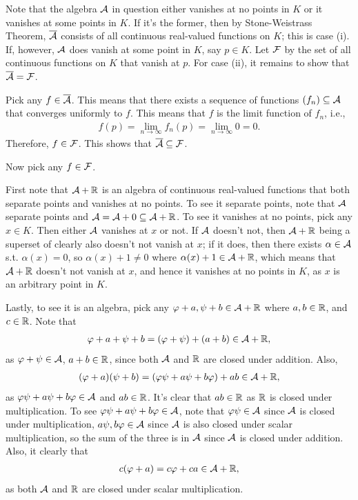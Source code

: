 \documentclass[12pt]{article}
\begin{document}
\begin{fproof}[4]
Note that the algebra \(\mathcal{A}\) in question either vanishes at no points in \(K\) or it vanishes at some points in \(K\). If it's the former, then by Stone-Weistrass Theorem, \(\overline{\mathcal{A}}\) consists of all continuous real-valued functions on \(K\); this is case (i). If, however, \(\mathcal{A}\) does vanish at some point in \(K\), say \(p \in K\). Let \(\mathcal{F}\) by the set of all continuous functions on \(K\) that vanish at \(p\). For case (ii), it remains to show that \(\overline{\mathcal{A}} = \mathcal{F}\).

Pick any \(f \in \overline{\mathcal{A}}\).
This means that there exists a sequence of functions \((f_n) \subseteq \mathcal{A}\) that converges uniformly to \(f\).
This means that \(f\) is the limit function of \(f_n\), i.e.,
\begin{align*}
    f(p) = \lim_{n \to \infty} f_n(p) = \lim_{n \to \infty} 0 = 0.
\end{align*}
Therefore, \(f \in \mathcal{F}\).
This shows that \(\overline{\mathcal{A}} \subseteq \mathcal{F}\).

Now pick any \(f \in \mathcal{F}\).

First note that \(\mathcal{A} + \mathbb {R}\) is an algebra of continuous real-valued functions that both separate points and vanishes at no points.
To see it separate points, note that \(\mathcal{A}\) separate points and \(\mathcal{A} = \mathcal{A} + 0 \subseteq \mathcal{A} + \mathbb {R}\). 
To see it vanishes at no points, pick any \(x \in K\). Then either \(\mathcal{A}\) vanishes at \(x\) or not.
If \(\mathcal{A}\) doesn't not, then \(\mathcal{A} + \mathbb {R}\) being a superset of clearly also doesn't not vanish at \(x\); if it does, then there exists \(\alpha \in \mathcal{A}\) s.t. \(\alpha(x) = 0\), so \(\alpha(x) + 1 \neq 0\) where \(\alpha(x) + 1 \in \mathcal{A} + \mathbb {R}\), which means that \(\mathcal{A} + \mathbb {R}\) doesn't not vanish at \(x\), and hence it vanishes at no points in \(K\), as \(x\) is an arbitrary point in \(K\).

Lastly, to see it is an algebra, pick any \(\varphi + a, \psi + b \in \mathcal{A} + \mathbb {R}\) where \(a,b \in \mathbb {R}\), and \(c \in \mathbb {R}\).
Note that
\begin{align*}
    \varphi + a + \psi + b = (\varphi + \psi) + (a + b) \in \mathcal{A} + \mathbb {R},
\end{align*}
as \(\varphi + \psi \in \mathcal{A}\), \(a+b \in \mathbb {R}\), since both \(\mathcal{A}\) and \(\mathbb {R}\) are closed under addition.
Also,
\begin{align*}
    (\varphi + a)(\psi + b) = (\varphi \psi + a \psi + b \varphi) + ab \in \mathcal{A} + \mathbb {R},
\end{align*}
as \(\varphi \psi + a \psi + b \varphi \in \mathcal{A}\) and \(ab \in \mathbb {R}\). It's clear that \(ab \in \mathbb {R}\) as \(\mathbb {R}\) is closed under multiplication. To see \(\varphi \psi + a \psi + b \varphi \in \mathcal{A}\), note that \(\varphi \psi \in \mathcal{A}\) since \(\mathcal{A}\) is closed under multiplication, \(a \psi, b \varphi \in \mathcal{A}\) since \(\mathcal{A}\) is also closed under scalar multiplication, so the sum of the three is in \(\mathcal{A}\) since \(\mathcal{A}\) is closed under addition.
Also, it clearly that
\begin{align*}
    c(\varphi + a) = c \varphi + ca \in \mathcal{A} + \mathbb {R},
\end{align*}
as both \(\mathcal{A}\) and \(\mathbb {R}\) are closed under scalar multiplication.


\end{fproof}
\end{document}
